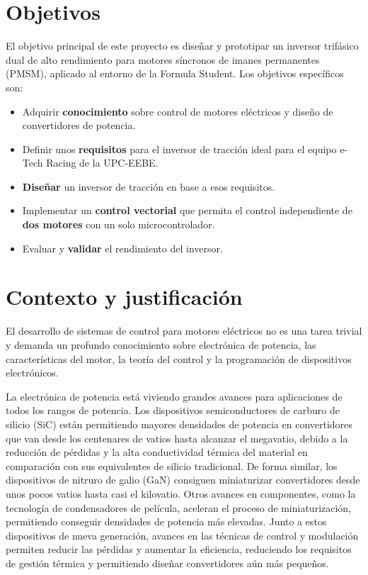 \section{Objetivos}
El objetivo principal de este proyecto es diseñar y prototipar un inversor trifásico dual de alto rendimiento para motores síncronos de imanes permanentes (PMSM), aplicado al entorno de la Formula Student. Los objetivos específicos son:

\begin{itemize}
	\item Adquirir \textbf{conocimiento} sobre control de motores eléctricos y diseño de convertidores de potencia.
	\item Definir unos \textbf{requisitos} para el inversor de tracción ideal para el equipo e-Tech Racing de la UPC-EEBE.
	\item \textbf{Diseñar} un inversor de tracción en base a esos requisitos.
	\item Implementar un \textbf{control vectorial} que permita el control independiente de \textbf{dos motores} con un solo microcontrolador.
	\item Evaluar y \textbf{validar} el rendimiento del inversor.
\end{itemize}

\section{Contexto y justificación}

El desarrollo de sistemas de control para motores eléctricos no es una tarea trivial y demanda un profundo conocimiento sobre electrónica de potencia, las características del motor, la teoría del control y la programación de dispositivos electrónicos.

La electrónica de potencia está viviendo grandes avances para aplicaciones de todos los rangos de potencia. Los dispositivos semiconductores de carburo de silicio (SiC) están permitiendo mayores densidades de potencia en convertidores que van desde los centenares de vatios hasta alcanzar el megavatio, debido a la reducción de pérdidas y la alta conductividad térmica del material en comparación con sus equivalentes de silicio tradicional. De forma similar, los dispositivos de nitruro de galio (GaN) consiguen miniaturizar convertidores desde unos pocos vatios hasta casi el kilovatio. Otros avances en componentes, como la tecnología de condensadores de película, aceleran el proceso de miniaturización, permitiendo conseguir densidades de potencia más elevadas. Junto a estos dispositivos de nueva generación, avances en las técnicas de control y modulación permiten reducir las pérdidas y aumentar la eficiencia, reduciendo los requisitos de gestión térmica y permitiendo diseñar convertidores aún más pequeños.

